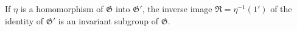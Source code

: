 If $\eta$ is a homomorphism of $\mathfrak{G}$ into $\mathfrak{G}'$, the inverse image $\mathfrak{R} = \eta^{-1}(1')$ of the identity of $\mathfrak{G}'$ is an invariant subgroup of $\mathfrak{G}$.
